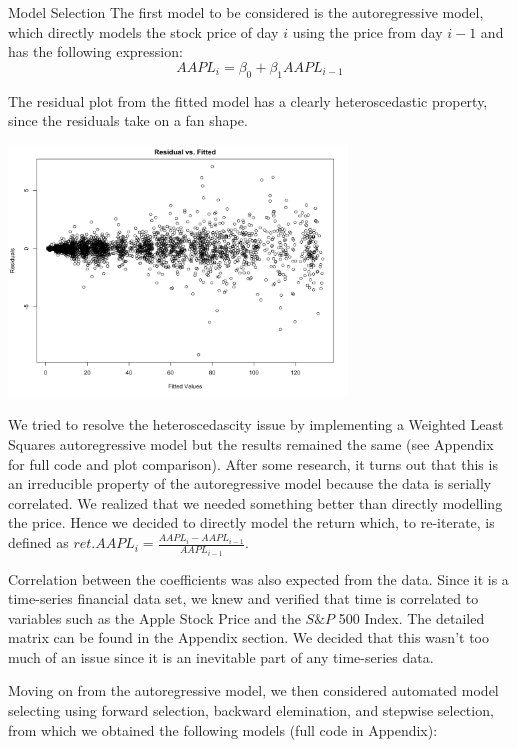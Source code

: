 \documentclass[]{article}
\begin{document}
\begin{section}{Model Selection}
The first model to be considered is the autoregressive model, which directly models the stock price of day $i$ using the price from day $i-1$ and has the following expression: $$ AAPL_i = \beta_0 + \beta_1 AAPL_{i-1}$$

The residual plot from the fitted model has a clearly heteroscedastic property, since the residuals take on a fan shape.

\begin{center}\includegraphics[width=90mm]{autoregressive_residual_vs_fitted.png}\end{center}

We tried to resolve the heteroscedascity issue by implementing a Weighted Least Squares autoregressive model but the results remained the same (see Appendix for full code and plot comparison). After some research, it turns out that this is an irreducible property of the autoregressive model because the data is serially correlated. We realized that we needed something better than directly modelling the price. Hence we decided to directly model the return which, to re-iterate, is defined as $ret.AAPL_i = \frac{AAPL_i - AAPL_{i-1}}{AAPL_{i-1}}$.

Correlation between the coefficients was also expected from the data. Since it is a time-series financial data set, we knew and verified that time is correlated to variables such as the Apple Stock Price and the $S \& P$ 500 Index. The detailed matrix can be found in the Appendix section. We decided that this wasn't too much of an issue since it is an inevitable part of any time-series data.

Moving on from the autoregressive model, we then considered automated model selecting using forward selection, backward elemination, and stepwise selection, from which we obtained the following models (full code in Appendix):



\end{section}
\end{document}
